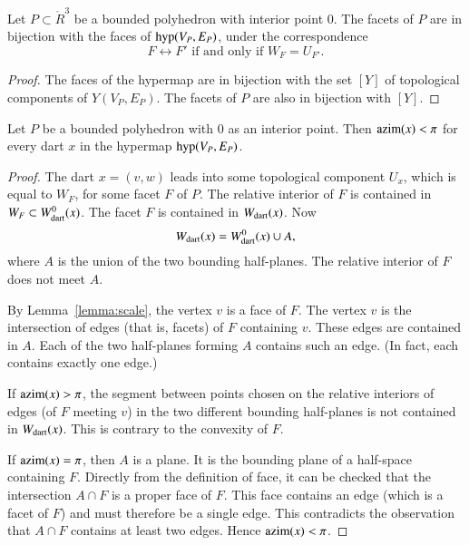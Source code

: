 \begin{lemma}
Let $P\subset\ring{R}^3$ be a bounded polyhedron with interior point $0$.  The
facets of $P$ are in bijection with the faces of ${\operatorname{hyp}}(V_P,E_P)$, under the
correspondence
$$
F\leftrightarrow F' \text{ if and only if } W_F = U_{F'}.
$$
\end{lemma}

\begin{proof}  The faces of the hypermap are in bijection with the set $[Y]$ of topological components of $Y(V_P,E_P)$.  The facets of $P$ are also in bijection with $[Y]$.
\end{proof}

\begin{lemma} Let $P$ be a bounded polyhedron with $0$ as an interior point.  Then ${\operatorname{azim}}(x) < \pi$  for every dart $x$ in the hypermap ${\operatorname{hyp}}(V_P,E_P)$.
\end{lemma}

\begin{proof}   The dart $x=(v,w)$ leads into some topological component $U_x$, which is equal to $W_F$, for some facet $F$ of $P$.  The relative interior of $F$ is contained in $W_F\subset W^0_{\text{dart}}(x)$.  The facet $F$ is contained in $W_{\text{dart}}(x)$. Now
$$
W_{\text{dart}}(x) = W^0_{\text{dart}}(x)\cup A,
$$
where $A$ is the union of the two bounding half-planes.   The relative interior of $F$ does not meet $A$.   

By Lemma~\ref{lemma:scale}, the vertex $v$ is a face of $F$.  The vertex $v$ is the intersection of edges (that is, facets) of $F$ containing $v$.  These edges are contained in $A$.  Each of the two half-planes forming $A$ contains such an edge. (In fact, each contains exactly one edge.)

If ${\operatorname{azim}}(x)>\pi$, the segment between points chosen on the relative interiors of edges (of $F$ meeting $v$) in the two different bounding half-planes is not contained in $W_{\text{dart}}(x)$.  This is contrary to the convexity of $F$.

If ${\operatorname{azim}}(x)=\pi$, then $A$ is a plane.  It is the bounding plane of a half-space containing $F$.  Directly from the definition of face, it can be checked that the intersection $A\cap F$ is a proper face of $F$.  This face contains an edge (which is a facet of $F$) and must therefore be a single edge.  This contradicts the observation that $A\cap F$ contains at least two edges.  Hence ${\operatorname{azim}}(x)<\pi$.
\end{proof}


